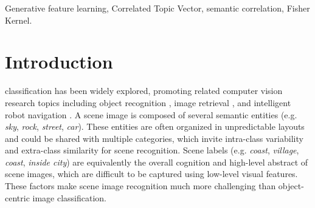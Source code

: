 \documentclass[journal]{IEEEtran}
\begin{document}
\begin{IEEEkeywords}
Generative feature learning, Correlated Topic Vector, semantic correlation, Fisher Kernel.
\end{IEEEkeywords}


%
\IEEEpeerreviewmaketitle

\section{Introduction} \label{Sec:Introduction}
 classification has been widely explored, promoting related computer vision research topics including object recognition \cite{torralba2003contextual, torralba2004contextual}, image retrieval \cite{wang2001simplicity, chang2003cbsa, vailaya1999content}, and intelligent robot navigation \cite{siagian2005gist, manduchi2005obstacle}. A scene image is composed of several semantic entities (e.g. \emph{sky}, \emph{rock}, \emph{street}, \emph{car}). These entities are often organized in unpredictable layouts \cite{quelhas2005modeling, galleguillos2008object} and could be shared with multiple categories, which invite intra-class variability and extra-class similarity for scene recognition. Scene labels (e.g. \emph{coast}, \emph{village}, \emph{coast}, \emph{inside city}) are equivalently the overall cognition and high-level abstract of scene images, which are difficult to be captured using low-level visual features. These factors make scene image recognition much more challenging than object-centric image classification.
\end{document}
